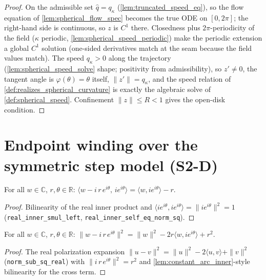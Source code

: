 \begin{proof}

\leanok
  On the admissible set $\hat q=q_\kappa$ (\cref{lem:truncated_speed_eq}), so the flow
  equation of \cref{lem:spherical_flow_spec} becomes the true ODE on $[0,2\pi]$; the
  right-hand side is continuous, so $z$ is $C^1$ there. Closedness plus
  $2\pi$-periodicity of the field ($\kappa$ periodic,
  \cref{lem:spherical_speed_periodic}) make the periodic extension a global $C^1$
  solution (one-sided derivatives match at the seam because the field values match).
  The speed $q_\kappa>0$ along the trajectory (\cref{lem:spherical_speed_solve} shape;
  positivity from admissibility), so $z'\ne0$, the tangent angle is $\varphi(\theta)=
  \theta$ itself, $\|z'\|=q_\kappa$, and the speed relation of
  \cref{def:realizes_spherical_curvature} is exactly the algebraic solve of
  \cref{def:spherical_speed}. Confinement $\|z\|\le R<1$ gives the open-disk condition.
\end{proof}

\section{Endpoint winding over the symmetric step model (S2-D)}
\label{sec:sphere_winding}

\begin{lemma}
  \label{lem:constant_arc_inner}
  For all $w\in\mathbb C$, $r,\theta\in\mathbb R$:
  $\bigl\langle w-i\,r\,e^{i\theta},\,i e^{i\theta}\bigr\rangle
   =\langle w,ie^{i\theta}\rangle-r$.
\end{lemma}

\begin{proof}

\leanok
  Bilinearity of the real inner product and
  $\langle ie^{i\theta},ie^{i\theta}\rangle=\|ie^{i\theta}\|^2=1$
  (\texttt{real\_inner\_smul\_left}, \texttt{real\_inner\_self\_eq\_norm\_sq}).
\end{proof}

\begin{lemma}
  \label{lem:constant_arc_norm_sq}
  For all $w\in\mathbb C$, $r,\theta\in\mathbb R$:
  $\|w-i\,r\,e^{i\theta}\|^2=\|w\|^2-2r\langle w,ie^{i\theta}\rangle+r^2$.
\end{lemma}

\begin{proof}

\leanok
  The real polarization expansion $\|u-v\|^2=\|u\|^2-2\langle u,v\rangle+\|v\|^2$
  (\texttt{norm\_sub\_sq\_real}) with $\|i\,r\,e^{i\theta}\|^2=r^2$ and
  \cref{lem:constant_arc_inner}-style bilinearity for the cross term.
\end{proof}

